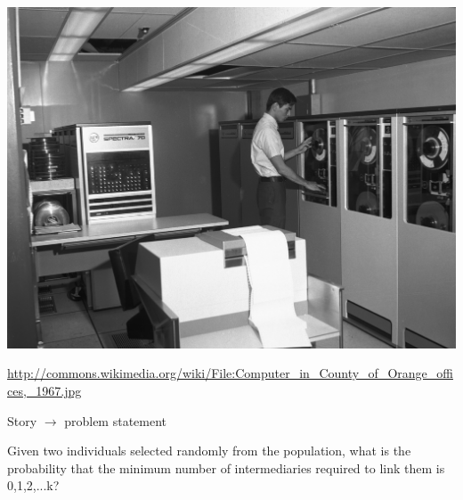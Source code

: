 \documentclass[aspectratio=169]{beamer}
\begin{document}
\begin{frame}

\begin{center}
\includegraphics[height=0.8\textheight]{figures/Computer_in_County_of_Orange_offices,_1967}
\end{center}

\vfill
\tiny{\url{http://commons.wikimedia.org/wiki/File:Computer_in_County_of_Orange_offices,_1967.jpg}}

\end{frame}
\begin{frame}

Story $\rightarrow$ problem statement

\end{frame}
\begin{frame}

Given two individuals selected randomly from the population, what is the probability that the minimum number of intermediaries required to link them is 0,1,2,...k?

\end{frame}
\end{document}
